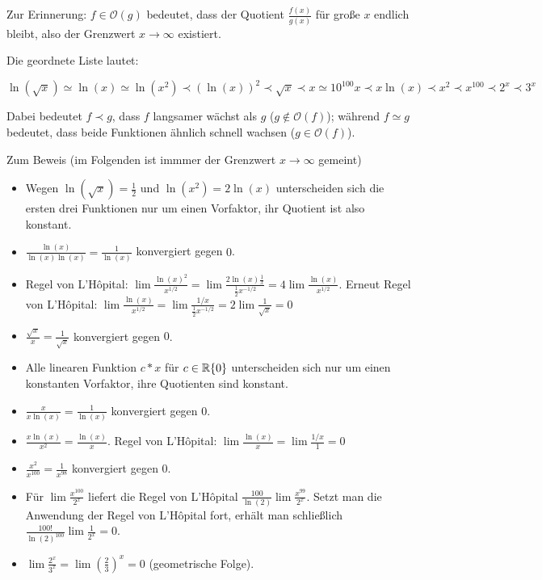 \item Zur Erinnerung: $f \in \mathcal{O}(g)$ bedeutet, dass der Quotient $\frac{f(x)}{g(x)}$ für große $x$ endlich bleibt, also der Grenzwert $x\to\infty$ existiert.

Die geordnete Liste lautet:

$$
  \ln(\sqrt{x}) \simeq \ln(x) \simeq \ln(x^2) \prec (\ln(x))^2 \prec \sqrt{x} \prec x \simeq 10^{100}x  \prec x\ln(x)  \prec x^2 \prec x^{100} \prec 2^x \prec 3^x
$$

Dabei bedeutet $f \prec g$, dass $f$ langsamer wächst als $g$ ($g \notin \mathcal{O}(f)$); während $f \simeq g$ bedeutet, dass beide Funktionen ähnlich schnell wachsen ($g \in \mathcal{O}(f)$).

Zum Beweis (im Folgenden ist immmer der Grenzwert $x \to \infty$ gemeint)

\begin{itemize}
	\item Wegen $\ln(\sqrt{x}) = \frac{1}{2}$ und $\ln(x^2)=2\ln(x)$ unterscheiden sich die ersten drei Funktionen nur um einen Vorfaktor, ihr Quotient ist also konstant.
	\item $\frac{\ln(x)}{\ln(x)\ln(x)} = \frac{1}{\ln(x)}$ konvergiert gegen $0$.
	\item Regel von L'Hôpital: $\lim \frac{\ln(x)^2}{x^{1/2}} = \lim \frac{2\ln(x)\frac{1}{x}}{\frac{1}{2}x^{-1/2}} = 4 \lim \frac{\ln(x)}{x^{1/2}}$. Erneut Regel von L'Hôpital: $\lim \frac{\ln(x)}{x^{1/2}} = \lim \frac{1/x}{\frac{1}{2} x^{-1/2}} = 2 \lim \frac{1}{\sqrt{x}} = 0$
	\item $\frac{\sqrt{x}}{x} = \frac{1}{\sqrt{x}}$ konvergiert gegen $0$.
	\item Alle linearen Funktion $c*x$ für $c\in\mathbb{R}\lbrace0\rbrace$ unterscheiden sich nur um einen konstanten Vorfaktor, ihre Quotienten sind konstant.
	\item $\frac{x}{x\ln(x)} = \frac{1}{\ln(x)}$ konvergiert gegen $0$.
	\item $\frac{x\ln(x)}{x^2} = \frac{\ln(x)}{x}$. Regel von L'Hôpital: $\lim \frac{\ln(x)}{x} = \lim \frac{1/x}{1} = 0$
	\item $\frac{x^2}{x^{100}} = \frac{1}{x^{98}}$ konvergiert gegen $0$.
	\item Für $\lim \frac{x^{100}}{2^x}$ liefert die Regel von L'Hôpital $\frac{100}{\ln(2)} \lim \frac{x^{99}}{2^x}$. Setzt man die Anwendung der Regel von L'Hôpital fort, erhält man schließlich $\frac{100!}{\ln(2)^{100}} \lim \frac{1}{2^x} = 0$.
	\item $\lim \frac{2^x}{3^x} = \lim \left(\frac{2}{3}\right)^x = 0$ (geometrische Folge).
\end{itemize}
